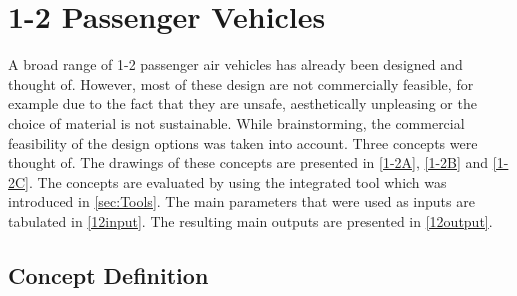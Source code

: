 \section{1-2 Passenger Vehicles}
A broad range of 1-2 passenger air vehicles has already been designed and thought of. However, most of these design are not commercially feasible, for example due to the fact that they are unsafe, aesthetically unpleasing or the choice of material is not sustainable. While brainstorming, the commercial feasibility of the design options was taken into account. Three concepts were thought of. The drawings of these concepts are presented in \autoref{1-2A}, \autoref{1-2B} and \autoref{1-2C}. The concepts are evaluated by using the integrated tool which was introduced in \autoref{sec:Tools}. The main parameters that were used as inputs are tabulated in \autoref{12input}. The resulting main outputs are presented in \autoref{12output}. 

\subsection{Concept Definition}

